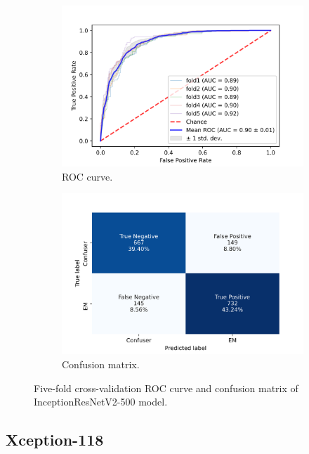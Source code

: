 \begin{figure}[h!]
	\centering
	\begin{subfigure}[b]{0.49\textwidth}
		\centering
		\includegraphics[width=\textwidth,keepaspectratio]{images/Supplement4/image110.png}
		\caption{ROC curve.}
	\end{subfigure}
	\hfill
	\begin{subfigure}[b]{0.49\textwidth}
		\centering
		\includegraphics[width=\textwidth,keepaspectratio]{images/Supplement4/image115.png}
		\caption{Confusion matrix.}
	\end{subfigure}
	\caption{Five-fold cross-validation ROC curve and confusion matrix of InceptionResNetV2-500 model.}
\end{figure}

\vfill\clearpage
\subsection{Xception-118}

